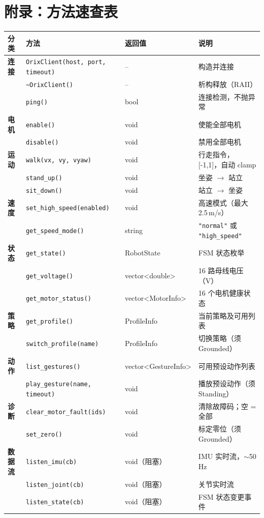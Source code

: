\documentclass[a4paper,11pt,openany]{book}
\begin{document}
\section*{附录：方法速查表}

{\small
\begin{longtable}{llll}
\toprule
分类 & 方法 & 返回值 & 说明 \\
\midrule
\endhead
\textbf{连接} & \texttt{OrixClient(host, port, timeout)} & -- & 构造并连接 \\
 & \texttt{\textasciitilde OrixClient()} & -- & 析构释放（RAII）\\
 & \texttt{ping()} & bool & 连接检测，不抛异常 \\
\textbf{电机} & \texttt{enable()} & void & 使能全部电机 \\
 & \texttt{disable()} & void & 禁用全部电机 \\
\textbf{运动} & \texttt{walk(vx, vy, vyaw)} & void & 行走指令，[-1,1]，自动 clamp \\
 & \texttt{stand\_up()} & void & 坐姿 $\to$ 站立 \\
 & \texttt{sit\_down()} & void & 站立 $\to$ 坐姿 \\
\textbf{速度} & \texttt{set\_high\_speed(enabled)} & void & 高速模式（最大 2.5\,m/s）\\
 & \texttt{get\_speed\_mode()} & string & \texttt{"normal"} 或 \texttt{"high\_speed"} \\
\textbf{状态} & \texttt{get\_state()} & RobotState & FSM 状态枚举 \\
 & \texttt{get\_voltage()} & vector<double> & 16 路母线电压（V）\\
 & \texttt{get\_motor\_status()} & vector<MotorInfo> & 16 个电机健康状态 \\
\textbf{策略} & \texttt{get\_profile()} & ProfileInfo & 当前策略及可用列表 \\
 & \texttt{switch\_profile(name)} & ProfileInfo & 切换策略（须 Grounded）\\
\textbf{动作} & \texttt{list\_gestures()} & vector<GestureInfo> & 可用预设动作列表 \\
 & \texttt{play\_gesture(name, timeout)} & void & 播放预设动作（须 Standing）\\
\textbf{诊断} & \texttt{clear\_motor\_fault(ids)} & void & 清除故障码；空 = 全部 \\
 & \texttt{set\_zero()} & void & 标定零位（须 Grounded）\\
\textbf{数据流} & \texttt{listen\_imu(cb)} & void（阻塞）& IMU 实时流，$\sim$50 Hz \\
 & \texttt{listen\_joint(cb)} & void（阻塞）& 关节实时流 \\
 & \texttt{listen\_state(cb)} & void（阻塞）& FSM 状态变更事件 \\
\bottomrule
\end{longtable}
}
\end{document}
